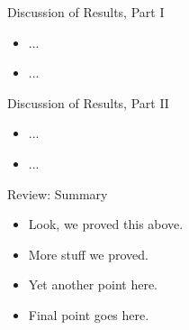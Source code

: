 \documentclass[12pt,t]{beamer}
\begin{document}

\begin{frame}[c]{Discussion of Results, Part I}

\begin{center}
\begin{itemize}
  \item ...
  \item ...
\end{itemize}
\end{center}

\note{
}

\end{frame}


\begin{frame}[c]{Discussion of Results, Part II}

\begin{center}
\begin{itemize}
  \item ...
  \item ...
\end{itemize}
\end{center}

\note{
}

\end{frame}


\begin{frame}[c]{Review: Summary}

\begin{center}
\begin{itemize}
  \itemsep12pt
  \item Look, we proved this above.
  \item More stuff we proved.
  \item Yet another point here.
  \item Final point goes here.
\end{itemize}
\end{center}


\end{frame}

\end{document}
